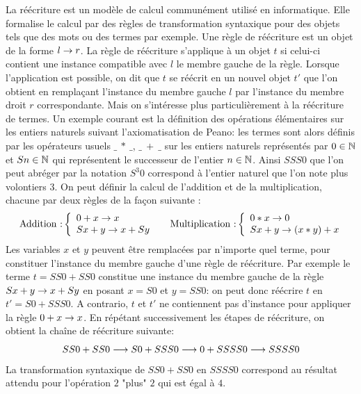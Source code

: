 La réécriture est un modèle de calcul communément utilisé en informatique.
Elle formalise le calcul par des règles de transformation syntaxique pour des objets tels
que des mots ou des termes par exemple. 
Une règle de réécriture est un objet de la forme $l \rightarrow r$.
La règle de réécriture s'applique à un objet $t$ si celui-ci contient une instance compatible
avec $l$ le membre gauche de la règle. Lorsque l'application est possible, on dit que $t$ se réécrit en un nouvel objet $t'$
que l'on obtient en remplaçant l'instance du membre gauche $l$ par l'instance du membre droit $r$ correspondante.
Mais on s'intéresse plus particulièrement à la réécriture de termes.
Un exemple courant est la définition des opérations élémentaires sur les entiers naturels suivant l'axiomatisation
de Peano: les termes sont alors définis par les opérateurs usuels $\_\ *\ \_$, $\_\ +\ \_$ sur les entiers naturels
représentés par $0 \in \mathbb N$ et $Sn \in \mathbb N$ qui représentent le successeur de l'entier $n \in \mathbb N$. Ainsi $SSS 0$
que l'on peut abréger par la notation $S^3 0$ correspond à l'entier naturel que l'on note plus volontiers $3$.
On peut définir la calcul de l'addition et de la multiplication, chacune par deux règles de la façon suivante :
\[
\textrm{ Addition :}\left\{
\begin{array}{l}
  0 + x \rightarrow x\\
  S x + y \rightarrow x + S y
\end{array}\right.
\quad
\textrm{ Multiplication :}\left\{
\begin{array}{l}
  0 * x \rightarrow 0\\
  S x + y \rightarrow (x * y) + x
\end{array}\right.
\]
Les variables $x$ et $y$ peuvent être remplacées par n'importe quel terme, pour constituer l'instance du membre gauche
d'une règle de réécriture. Par exemple le terme $t = SS0 + SS0$ constitue une instance du membre gauche de la règle
$S x + y \rightarrow x + S y$ en posant $x = S0$ et $y = SS0$: on peut donc réécrire $t$ en $t' = S0 + SSS0$. 
A contrario, $t$ et $t'$ ne contiennent pas d'instance pour appliquer la règle $0 + x \rightarrow x$.
En répétant successivement les étapes de réécriture, on obtient la chaîne de réécriture suivante:
\[ SS0 + SS0 \longrightarrow S0 + SSS0 \longrightarrow 0 + SSSS0 \longrightarrow SSSS0 \]
La transformation syntaxique de $SS0 + SS0$ en $SSSS0$ correspond au résultat attendu pour l'opération $2$ "plus" $2$ 
qui est égal à $4$.

\newcommand{\fib}{\mathit{fib}}

